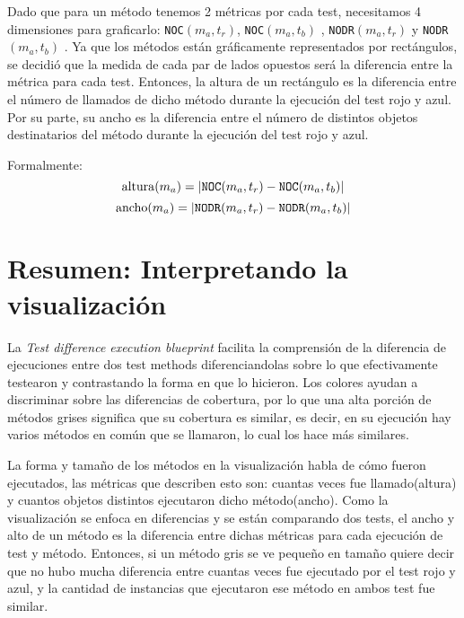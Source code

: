 \par Dado que para un método tenemos 2 métricas por cada test, necesitamos 4 dimensiones para graficarlo: {\tt NOC}$(m_a,t_r)$, {\tt NOC}$(m_a,t_b)$ , {\tt NODR}$(m_a,t_r)$ y {\tt NODR}$(m_a,t_b)$ . Ya que los métodos están gráficamente representados por rectángulos, se decidió que la medida de cada par de lados opuestos será la diferencia entre la métrica para cada test. Entonces, la altura de un rectángulo es la diferencia entre el número de llamados de dicho método durante la ejecución del test rojo y azul. Por su parte, su ancho es la diferencia entre el número de distintos objetos destinatarios del método durante la ejecución del test rojo y azul. 

\par Formalmente:
\[ {\rm altura}(m_a) = \vert {\tt NOC}(m_a,t_r) - {\tt NOC}(m_a,t_b) \vert \]
\[ {\rm ancho}(m_a) = \vert {\tt NODR}(m_a,t_r) - {\tt NODR}(m_a,t_b) \vert \]


\section{Resumen: Interpretando la visualización}


\par La \emph{Test difference execution blueprint} facilita la comprensión de la diferencia de ejecuciones entre dos test methods diferenciandolas sobre lo que efectivamente testearon y contrastando la forma en que lo hicieron. Los colores ayudan a discriminar sobre las diferencias de cobertura, por lo que una alta porción de métodos grises significa que su cobertura es similar, es decir, en su ejecución hay varios métodos en común que se llamaron, lo cual los hace más similares.

\par La forma y tamaño de los métodos en la visualización habla de cómo fueron ejecutados, las métricas que describen esto son: cuantas veces fue llamado(altura) y cuantos objetos distintos ejecutaron dicho método(ancho). Como la visualización se enfoca en diferencias y se están comparando dos tests, el ancho y alto de un método es la diferencia entre dichas métricas para cada ejecución de test y método. Entonces, si un método gris se ve pequeño en tamaño quiere decir que no hubo mucha diferencia entre cuantas veces fue ejecutado por el test rojo y azul, y la cantidad de instancias que ejecutaron ese método en ambos test fue similar. 

